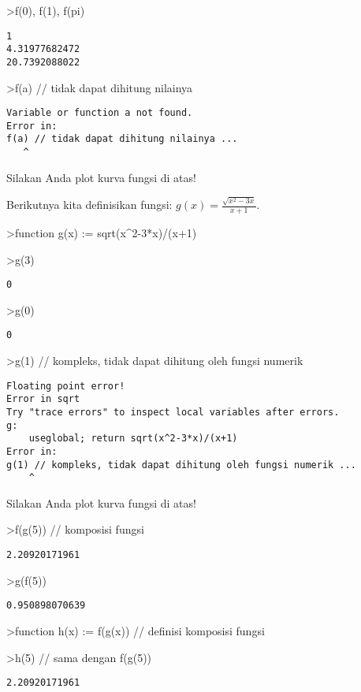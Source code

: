 \documentclass[
]{book}
\begin{document}
\textgreater f(0), f(1), f(pi)

\begin{verbatim}
1
4.31977682472
20.7392088022
\end{verbatim}

\textgreater f(a) // tidak dapat dihitung nilainya

\begin{verbatim}
Variable or function a not found.
Error in:
f(a) // tidak dapat dihitung nilainya ...
   ^
\end{verbatim}

Silakan Anda plot kurva fungsi di atas!

Berikutnya kita definisikan fungsi: \(g(x)=\frac{\sqrt{x^2-3x}}{x+1}.\)

\textgreater function g(x) := sqrt(x\^{}2-3*x)/(x+1)

\textgreater g(3)

\begin{verbatim}
0
\end{verbatim}

\textgreater g(0)

\begin{verbatim}
0
\end{verbatim}

\textgreater g(1) // kompleks, tidak dapat dihitung oleh fungsi numerik

\begin{verbatim}
Floating point error!
Error in sqrt
Try "trace errors" to inspect local variables after errors.
g:
    useglobal; return sqrt(x^2-3*x)/(x+1) 
Error in:
g(1) // kompleks, tidak dapat dihitung oleh fungsi numerik ...
    ^
\end{verbatim}

Silakan Anda plot kurva fungsi di atas!

\textgreater f(g(5)) // komposisi fungsi

\begin{verbatim}
2.20920171961
\end{verbatim}

\textgreater g(f(5))

\begin{verbatim}
0.950898070639
\end{verbatim}

\textgreater function h(x) := f(g(x)) // definisi komposisi fungsi

\textgreater h(5) // sama dengan f(g(5))

\begin{verbatim}
2.20920171961
\end{verbatim}
\end{document}
